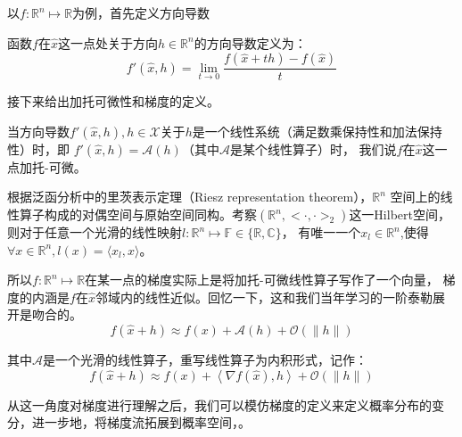 \par
以$f:\mathbb{R} ^n\mapsto \mathbb{R} $为例，首先定义方向导数
\begin{definition}
    函数$f$在$\widehat{x} $这一点处关于方向$h\in \mathbb{R}^n$的方向导数定义为：
    \begin{equation}
        f'(\widehat{x},h) = \lim_{t\to 0}\frac{f(\widehat{x}+th)-f(\widehat{x})}{t}  
    \end{equation}
\end{definition}

接下来给出加托可微性和梯度的定义。
\begin{definition}
    当方向导数$f'(\widehat{x},h) ,h\in \mathcal{X} $关于$h$是一个线性系统（满足数乘保持性和加法保持性）时，即
    $f'(\widehat{x},h) = \mathcal{A} (h)$（其中$\mathcal{A} $是某个线性算子）时，
    我们说$f$在$\widehat{x}$这一点加托-可微。
\end{definition}

根据泛函分析中的里茨表示定理（Riesz representation theorem），$\mathbb{R} ^n$
空间上的线性算子构成的对偶空间与原始空间同构。考察$(\mathbb{R} ^n,<\cdot,\cdot>_2)$这一Hilbert空间，
则对于任意一个光滑的线性映射$l:\mathbb{R} ^n \mapsto \mathbb{F} \in \{\mathbb{R} ,\mathbb{C} \} $，
有唯一一个$x_{l } \in \mathbb{R} ^n $,使得$\forall x \in \mathbb{R} ^n ,l(x) = \langle x_{l } ,x\rangle $。
\par
所以$f:\mathbb{R} ^n\mapsto \mathbb{R} $在某一点的梯度实际上是将加托-可微线性算子写作了一个向量，
梯度的内涵是$f$在$\widehat{x}$邻域内的线性近似。回忆一下，这和我们当年学习的一阶泰勒展开是吻合的。
$$f(\widehat{x}+h) \approx f(x)+\mathcal{A} (h)+\mathcal{O} (\parallel h\parallel )$$

其中$\mathcal{A}$是一个光滑的线性算子，重写线性算子为内积形式，记作：
$$f(\widehat{x}+h) \approx f(x)+\left\langle  \nabla f(\widehat{x}),h \right\rangle +\mathcal{O} (\parallel h\parallel )$$

\par 
从这一角度对梯度进行理解之后，我们可以模仿梯度的定义来定义概率分布的变分，进一步地，将梯度流拓展到概率空间，。